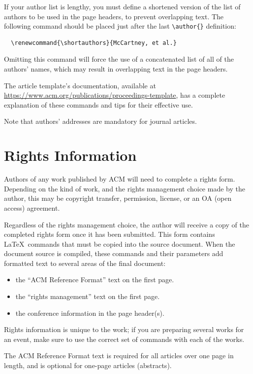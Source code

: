 \documentclass[manuscript,screen]{acmart}
\begin{document}
If your author list is lengthy, you must define a shortened version of
the list of authors to be used in the page headers, to prevent
overlapping text. The following command should be placed just after
the last \verb|\author{}| definition:
\begin{verbatim}
  \renewcommand{\shortauthors}{McCartney, et al.}
\end{verbatim}
Omitting this command will force the use of a concatenated list of all
of the authors' names, which may result in overlapping text in the
page headers.

The article template's documentation, available at
\url{https://www.acm.org/publications/proceedings-template}, has a
complete explanation of these commands and tips for their effective
use.

Note that authors' addresses are mandatory for journal articles.

\section{Rights Information}

Authors of any work published by ACM will need to complete a rights
form. Depending on the kind of work, and the rights management choice
made by the author, this may be copyright transfer, permission,
license, or an OA (open access) agreement.

Regardless of the rights management choice, the author will receive a
copy of the completed rights form once it has been submitted. This
form contains \LaTeX\ commands that must be copied into the source
document. When the document source is compiled, these commands and
their parameters add formatted text to several areas of the final
document:
\begin{itemize}
\item the ``ACM Reference Format'' text on the first page.
\item the ``rights management'' text on the first page.
\item the conference information in the page header(s).
\end{itemize}

Rights information is unique to the work; if you are preparing several
works for an event, make sure to use the correct set of commands with
each of the works.

The ACM Reference Format text is required for all articles over one
page in length, and is optional for one-page articles (abstracts).
\end{document}

